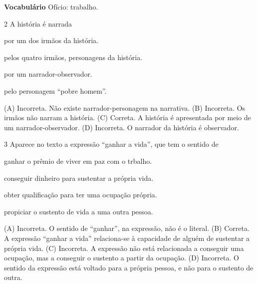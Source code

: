 \textbf{Vocabulário}
Ofício: trabalho.

\num{2} A história é narrada

\begin{escolha}
\item por um dos irmãos da história.

\item pelos quatro irmãos, personagens da história.

\item por um narrador-observador.

\item pelo personagem ``pobre homem''.
\end{escolha}


(A) Incorreta. Não existe narrador-personagem na narrativa.
(B) Incorreta. Os irmãos não narram a história.
(C) Correta. A história é apresentada por meio de um narrador-observador.
(D) Incorreta. O narrador da história é observador.

\num{3} Aparece no texto a expressão ``ganhar a vida'', que tem o sentido de

\begin{escolha}
\item ganhar o prêmio de viver em paz com o trbalho.

\item conseguir dinheiro para sustentar a própria vida.

\item obter qualificação para ter uma ocupação própria.

\item propiciar o sustento de vida a uma outra pessoa.
\end{escolha}


(A) Incorreta. O sentido de ``ganhar'', na expressão, não é o literal.
(B) Correta. A expressão ``ganhar a vida'' relaciona-se à capacidade de alguém de sustentar a própria vida.
(C) Incorreta. A expressão não está relacionada a conseguir uma ocupação, mas a conseguir o sustento a partir da ocupação.
(D) Incorreta. O sentido da expressão está voltado para a própria pessoa, e não para o sustento de outra.

